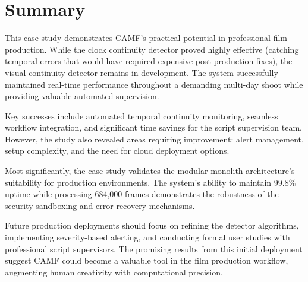 \section{Summary}
\label{sec:case-summary}

This case study demonstrates CAMF's practical potential in professional film production. While the clock continuity detector proved highly effective (catching temporal errors that would have required expensive post-production fixes), the visual continuity detector remains in development. The system successfully maintained real-time performance throughout a demanding multi-day shoot while providing valuable automated supervision.

Key successes include automated temporal continuity monitoring, seamless workflow integration, and significant time savings for the script supervision team. However, the study also revealed areas requiring improvement: alert management, setup complexity, and the need for cloud deployment options.

Most significantly, the case study validates the modular monolith architecture's suitability for production environments. The system's ability to maintain 99.8\% uptime while processing 684,000 frames demonstrates the robustness of the security sandboxing and error recovery mechanisms.

Future production deployments should focus on refining the detector algorithms, implementing severity-based alerting, and conducting formal user studies with professional script supervisors. The promising results from this initial deployment suggest CAMF could become a valuable tool in the film production workflow, augmenting human creativity with computational precision.